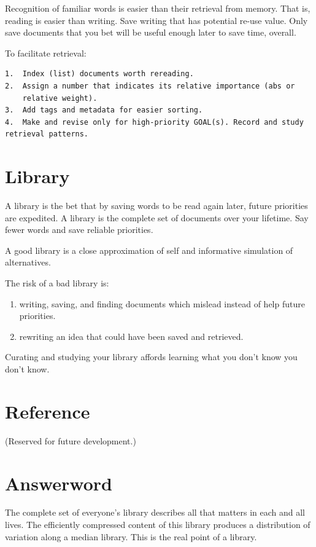\documentclass[
]{book}
\providecommand{\tightlist}{%
  \setlength{\itemsep}{0pt}\setlength{\parskip}{0pt}}
\begin{document}
Recognition of familiar words is easier than their retrieval from memory.
That is, reading is easier than writing.
Save writing that has potential re-use value.
Only save documents that you bet will be useful enough later to save time, overall.

To facilitate retrieval:

\begin{verbatim}
1.  Index (list) documents worth rereading.
2.  Assign a number that indicates its relative importance (abs or
    relative weight).
3.  Add tags and metadata for easier sorting.
4.  Make and revise only for high-priority GOAL(s). Record and study retrieval patterns.
\end{verbatim}

\section{Library}\label{library}

A library is the bet that by saving words to be read again later, future priorities are expedited.
A library is the complete set of documents over your lifetime.
Say fewer words and save reliable priorities.

A good library is a close approximation of self and informative simulation of alternatives.

The risk of a bad library is:

\begin{enumerate}
\def\labelenumi{\arabic{enumi}.}
\tightlist
\item
  writing, saving, and finding documents which mislead instead of help future priorities.
\item
  rewriting an idea that could have been saved and retrieved.
\end{enumerate}

Curating and studying your library affords learning what you don't know you don't know.

\section{Reference}\label{reference}

(Reserved for future development.)

\section{Answerword}\label{answerword}

The complete set of everyone's library describes all that matters in each and all lives.
The efficiently compressed content of this library produces a distribution of variation along a median library.
This is the real point of a library.
\end{document}
